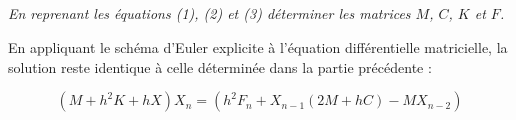 \documentclass[10pt]{article}
\newif\ifprof
\begin{document}
\subparagraph{}
\textit{En reprenant les équations (1), (2) et (3) déterminer les matrices $M$, $C$, $K$ et $F$.}
\ifprof
\begin{corrige}
\footnotesize{
$$
M =
\begin{pmatrix}
m  &  0 & 0 \\
0  & \ddots &0 \\
0 & 0 &  m \\
 \end{pmatrix}
 \quad
C =
\begin{pmatrix}
2c  & -c &  0 & \cdots & \cdots & \cdots  & 0 \\
-c  & 2c & -c & \ddots &  & 0& \vdots\\
0 & -c  & 2c & \ddots & \ddots &  & \vdots\\
\vdots & \ddots &\ddots & \ddots & \ddots & \ddots & \vdots\\
\vdots &  & \ddots &\ddots& 2c & -c & 0 \\
\vdots & 0 &  & \ddots & -c & 2c & -c\\
0 & \cdots & \cdots & \cdots & 0 & -c & 2c\\
 \end{pmatrix}
 \quad
K =
\begin{pmatrix}
2k  & -k &  0 & \cdots & \cdots & \cdots  & 0 \\
-k & 2k & -k & \ddots &  & 0& \vdots\\
0 & -k  & 2k & \ddots & \ddots &  & \vdots\\
\vdots & \ddots &\ddots & \ddots & \ddots & \ddots & \vdots\\
\vdots &  & \ddots &\ddots& 2k & -k & 0 \\
\vdots & 0 &  & \ddots & -k & 2k & -k\\
0 & \cdots & \cdots & \cdots & 0 & -k & 2k\\
 \end{pmatrix}
 \quad
 F =
 \begin{pmatrix}
 0 \\
 \vdots \\
 0 \\
 f_n(t) 
 \end{pmatrix}
$$}
\end{corrige}
\else
\fi



En appliquant le schéma d'Euler explicite à l'équation différentielle matricielle, la solution reste identique à celle déterminée dans la partie précédente :

$$
\left(M +h^2K+hX\right)X_{n}= \left(h^2F_n +X_{n-1}(2M+hC) -MX_{n-2} \right)
$$ 
 
\end{document}
